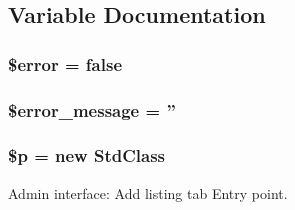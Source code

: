\subsection{Variable Documentation}
\hypertarget{property__add_8php_aeba2ab722cedda53dbb7ec1a59f45550}{
\subsubsection[{\$error}]{\setlength{\rightskip}{0pt plus 5cm}\$error = false}}
\label{dc/dab/property__add_8php_aeba2ab722cedda53dbb7ec1a59f45550}
\hypertarget{property__add_8php_ae838cbd355959defbd4d49d0fbe7b273}{
\subsubsection[{\$error\_\-message}]{\setlength{\rightskip}{0pt plus 5cm}\$error\_\-message = ''}}
\label{dc/dab/property__add_8php_ae838cbd355959defbd4d49d0fbe7b273}
\hypertarget{property__add_8php_ab0ed46ece3f8d301125a0f2728d90d7b}{
\subsubsection[{\$p}]{\setlength{\rightskip}{0pt plus 5cm}\$p = new StdClass}}
\label{dc/dab/property__add_8php_ab0ed46ece3f8d301125a0f2728d90d7b}


Admin interface: Add listing tab Entry point. 


